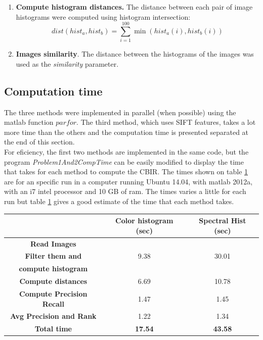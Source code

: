 \documentclass[a4paper,12pt]{article}
\begin{document}
\begin{enumerate}
\begin{figure}[h]
            \label{fig:spechist}
        \end{figure}
    \item \textbf{Compute histogram distances.} The distance between
        each pair of image histograms were computed using histogram intersection:
        \begin{equation}
            dist(hist_a,hist_b) = \sum_{i=1}^{100} \min( hist_a(i), hist_b(i))
        \end{equation}
    \item \textbf{Images similarity}. The distance between the histograms
        of the images was used as the \emph{similarity} parameter. 
\end{enumerate}

\subsection{Computation time}
The three methods were implemented in parallel (when possible) using the
matlab function $parfor$. The third method, which uses SIFT features,
takes a lot more time than the others and the computation time is presented separated
at the end of this section. \\

For eficiency, the first two methods are implemented in the same code, but the program 
\emph{Problem1And2CompTime} can be easily modified to display the time that
takes for each method to compute the CBIR. The times shown on table \ref{tab:times}
are for an specific run in a computer running Ubuntu 14.04, with matlab 2012a, 
with an i7 intel processor and 10 GB of ram. The times varies a little for each run
but table \ref{tab:times} gives a good estimate of the time that each method takes.
\begin{table}[h!]
    \centering
    \begin{tabular}{|c|c|c|}
        \hline
        & \textbf{Color histogram (sec)} & \textbf{Spectral Hist (sec)} \\
        \hline
        \textbf{Read Images} & & \\
        \textbf{Filter them and} & 9.38 & 30.01 \\
        \textbf{compute histogram} & & \\
        \hline
        \textbf{Compute distances} & 6.69 & 10.78  \\
        \hline
        \textbf{Compute Precision Recall } & 1.47 & 1.45 \\
        \hline
        \textbf{Avg Precision and Rank} & 1.22 & 1.34 \\
        \hline
        \textbf{Total time} & \textbf{17.54} & \textbf{43.58}\\
        \hline
    \end{tabular}
    \label{tab:times}
\end{table}
\end{document}
